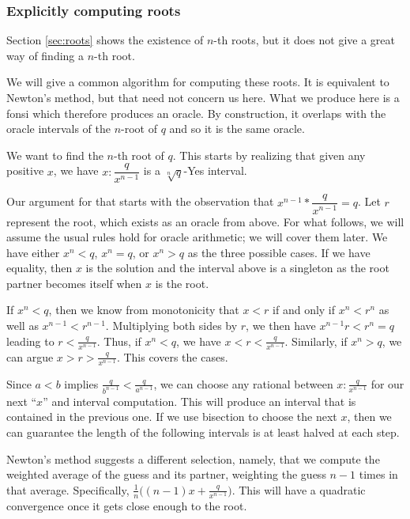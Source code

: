 \documentclass[12pt]{article}
\theoremstyle{remark}
\begin{document}
\subsubsection{Explicitly computing roots}

Section \ref{sec:roots} shows the existence of $n$-th roots, but it does not give a great way of finding a $n$-th root. 

We will give a common algorithm for computing these roots. It is equivalent to Newton's method, but that need not concern us here. What we produce here is a fonsi which therefore produces an oracle. By construction, it overlaps with the oracle intervals of the $n$-root of $q$ and so it is the same oracle. 

We want to find the $n$-th root of $q$. This starts by realizing that given any positive $x$, we have $x:\dfrac{q}{x^{n-1}}$ is a $\sqrt[n]{q}$-Yes interval. 

Our argument for that starts with the observation that $x^{n-1}*\dfrac{q}{x^{n-1}} = q$. Let $r$ represent the root, which exists as an oracle from above. For what follows, we will assume the usual rules hold for oracle arithmetic; we will cover them later. We have either $x^n < q$, $x^n = q$, or $x^n > q$ as the three possible cases. If we have equality, then $x$ is the solution and the interval above is a singleton as the root partner becomes itself when $x$ is the root. 

If $x^n < q$, then we know from monotonicity that $x < r$ if and only if $x^n < r^n$ as well as $x^{n-1} < r^{n-1}$. Multiplying both sides by $r$, we then have $x^{n-1} r < r^{n} = q$ leading to $r < \frac{q}{x^{n-1}}$. Thus, if $x^n < q$, we have $x<r<\frac{q}{x^{n-1}}$. Similarly, if $x^n > q$, we can argue $x > r > \frac{q}{x^{n-1}}$. This covers the cases. 

Since $a<b$ implies $\frac{q}{b^{n-1}} < \frac{q}{a^{n-1}}$, we can choose any rational between $x:\frac{q}{x^{n-1}}$ for our next ``$x$'' and interval computation. This will produce an interval that is contained in the previous one. If we use bisection to choose the next $x$, then we can guarantee the length of the following intervals is at least halved at each step. 

Newton's method suggests a different selection, namely, that we compute the weighted average of the guess and its partner, weighting the guess $n-1$ times in that average. Specifically, $\frac{1}{n} \big( (n-1) x + \frac{q}{x^{n-1}} \big)$. This will have a quadratic convergence once it gets close enough to the root.
\end{document}
